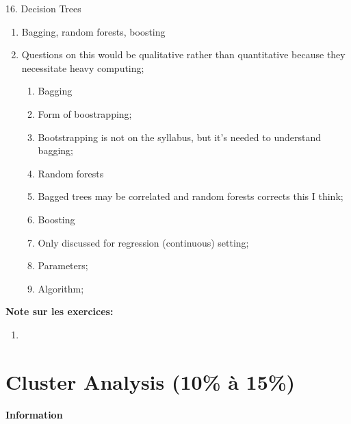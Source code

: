 \documentclass[12pt, titlepage, french]{report}
\begin{document}
\begin{CHPT_SUMM}[label = {DECISION-TREES}]{16. Decision Trees}
\begin{enumerate}
\begin{itemize}
\begin{itemize}
			\item	higher $\alpha$ => smaller tree
		\end{itemize}
		\item	To optimise a \textbf{classification} tree, we minimize the classification error rate instead of the MSE;
		\item	The classification error rate is not sufficiently sensitive to grow the tree so we use the \textbf{Gini index} or the \textbf{cross-entropy} instead;		
		\item	Note on measure to use for pruning;
		\item	Residual mean deviance;
		\item	Advantages over linear models
		\item	Shortcomings;
	\end{itemize}
	\item	Bagging, random forests, boosting
	\item[]	Questions on this would be qualitative rather than quantitative because they necessitate heavy computing;
	\begin{enumerate}
		\item	Bagging	
		\item[]	Form of boostrapping;
		\item[]	Bootstrapping is not on the syllabus, but it's needed to understand bagging;
		\item	Random forests
		\item[]	Bagged trees may be correlated and random forests corrects this I think;
		\item	Boosting
		\item[]	Only discussed for regression (continuous) setting;
		\item[]	Parameters;
		\item[]	Algorithm;
	\end{enumerate}
\end{enumerate}
\textbf{Note sur les exercices:} 
\begin{enumerate}
	\item	
\end{enumerate}
\end{CHPT_SUMM}

\newpage
\chapter[Cluster Analysis]{Cluster Analysis (10\% à 15\%)}

\subsubsection{Information}
\end{document}
